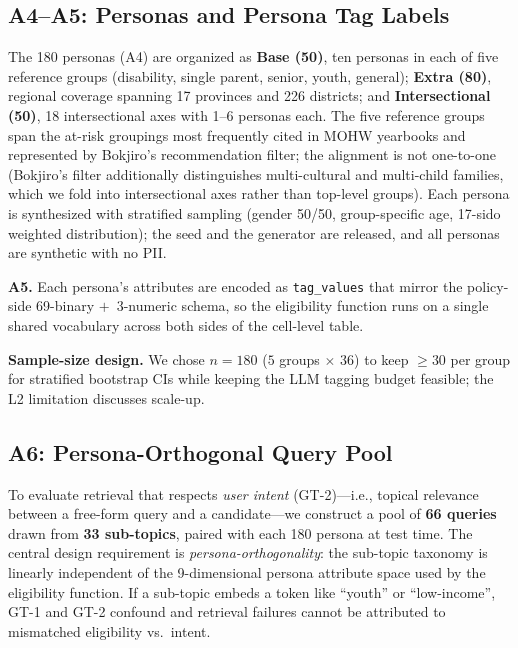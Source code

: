 \documentclass{article}
\newcommand{\npersona}{180}
\newcommand{\nquery}{66}
\newcommand{\ndim}{69}
\begin{document}
\subsection{A4--A5: Personas and Persona Tag Labels}
\label{sec:bench:a4}
\label{sec:bench:a5}

The \npersona{} personas (A4) are organized as
\textbf{Base (50)}, ten personas in each of five reference groups
(disability, single parent, senior, youth, general);
\textbf{Extra (80)}, regional coverage spanning 17 provinces and
226 districts; and \textbf{Intersectional (50)}, 18 intersectional
axes with 1--6 personas each. The five reference groups span the
at-risk groupings most frequently cited in MOHW yearbooks and
represented by Bokjiro's recommendation filter; the alignment is not
one-to-one (Bokjiro's filter additionally distinguishes
multi-cultural and multi-child families, which we fold into
intersectional axes rather than top-level groups). Each persona is
synthesized with stratified sampling (gender 50/50, group-specific
age, 17-sido weighted distribution); the seed and the generator are
released, and all personas are synthetic with no PII.

\textbf{A5.} Each persona's attributes are encoded as
\texttt{tag\_values} that mirror the policy-side \ndim{}-binary
$+$~3-numeric schema, so the eligibility function runs on a single
shared vocabulary across both sides of the cell-level table.

\textbf{Sample-size design.} We chose $n{=}\npersona{}$
($5$ groups $\times$ $36$) to keep $\geq{}30$ per group for
stratified bootstrap CIs while keeping the LLM tagging budget
feasible; the L2 limitation discusses scale-up.

\subsection{A6: Persona-Orthogonal Query Pool}
\label{sec:bench:a6}

To evaluate retrieval that respects \emph{user intent} (GT-2)---i.e.,
topical relevance between a free-form query and a candidate---we
construct a pool of \textbf{\nquery{} queries} drawn from
\textbf{33 sub-topics}, paired with each \npersona{} persona at test
time. The central design requirement is
\emph{persona-orthogonality}: the sub-topic taxonomy is
linearly independent of the 9-dimensional persona attribute space
used by the eligibility function. If a sub-topic embeds a token like
``youth'' or ``low-income'', GT-1 and GT-2 confound and retrieval
failures cannot be attributed to mismatched eligibility vs.\ intent.
\end{document}
